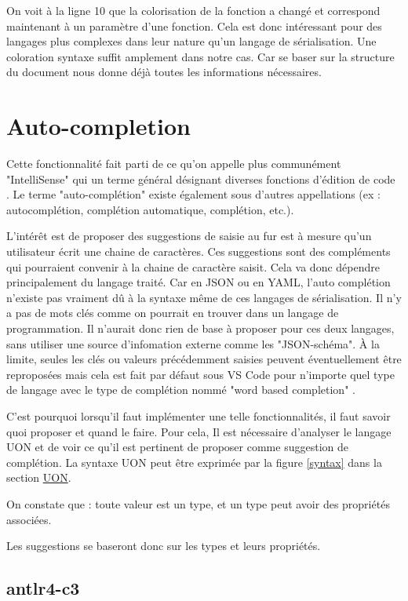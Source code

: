 \documentclass[
    iict, %
    il, %
]{heig-tb}
\begin{document}
On voit à la ligne 10 que la colorisation de la fonction a changé et correspond maintenant à un paramètre d'une fonction.
Cela est donc intéressant pour des langages plus complexes dans leur nature qu'un langage de sérialisation. Une coloration syntaxe suffit amplement dans notre cas.
Car se baser sur la structure du document nous donne déjà toutes les informations nécessaires.

\section{Auto-completion}

Cette fonctionnalité fait parti de ce qu'on appelle plus communément "IntelliSense" qui un terme général désignant diverses fonctions d'édition de code \cite{intelliSense}.
Le terme "auto-complétion" existe également sous d'autres appellations (ex : autocomplétion, complétion automatique, complétion, etc.).

L'intérêt est de proposer des suggestions de saisie au fur est à mesure qu'un utilisateur écrit une chaine de caractères.
Ces suggestions sont des compléments qui pourraient convenir à la chaine de caractère saisit. Cela va donc dépendre principalement du langage traité.
Car en JSON ou en YAML, l'auto complétion n'existe pas vraiment dû à la syntaxe même de ces langages de sérialisation.
Il n'y a pas de mots clés comme on pourrait en trouver dans un langage de programmation.
Il n'aurait donc rien de base à proposer pour ces deux langages, sans utiliser une source d'infomation externe comme les "JSON-schéma".
À la limite, seules les clés ou valeurs précédemment saisies peuvent éventuellement être reproposées mais cela est fait par défaut sous VS Code pour n'importe quel type de langage
avec le type de complétion nommé "word based completion" \cite{word-based-completions}.

C'est pourquoi lorsqu'il faut implémenter une telle fonctionnalités, il faut savoir quoi proposer et quand le faire.
Pour cela, Il est nécessaire d'analyser le langage UON et de voir ce qu'il est pertinent de proposer comme suggestion de complétion.
La syntaxe UON peut être exprimée par la figure \ref{syntax} dans la section \hyperref[UON]{UON}.

On constate que : toute valeur est un type, et un type peut avoir des propriétés associées.

Les suggestions se baseront donc sur les types et leurs propriétés.

\subsection{antlr4-c3}
\end{document}
